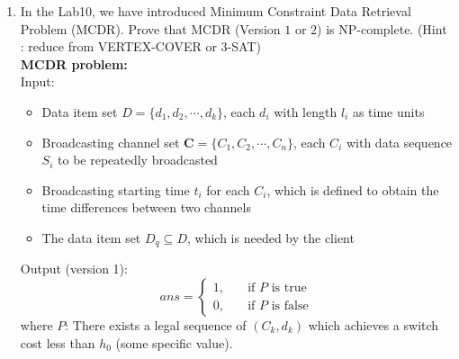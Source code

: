 \documentclass[12pt,a4paper]{article}
\theoremstyle{definition}
\begin{document}
\begin{enumerate}
	\item In the Lab10, we have introduced Minimum Constraint Data Retrieval Problem (MCDR). Prove that MCDR (Version $1$ or $2$) is NP-complete. (Hint : reduce from VERTEX-COVER or $3$-SAT) \\
	\textbf{MCDR problem:} \\
	Input: 
	\begin{itemize}
		\item
		Data item set $D = \{d_1, d_2,\cdots, d_k\}$, each $d_i$ with length $l_i$ as time units
		\item
		Broadcasting channel set $\mathbf{C}=\{C_1, C_2, \cdots, C_n\}$, each $C_i$ with data sequence $S_i$ to be repeatedly broadcasted
		\item
		Broadcasting starting time $t_i$ for each $C_i$, which is defined to obtain the time differences between two channels
		\item
		The data item set $D_q \subseteq D$, which is needed by the client
	\end{itemize}

	Output (version 1):
	\[
	ans = 
	\begin{cases}
	1, \quad & \text{if } P \text{ is true} \\
	0, \quad & \text{if } P \text{ is false}
	\end{cases}
	\]
	where $P$: There exists a legal sequence of $(C_k, d_k)$ which achieves a switch cost less than $h_0$ (some specific value).
	

\end{enumerate}
\end{document}
